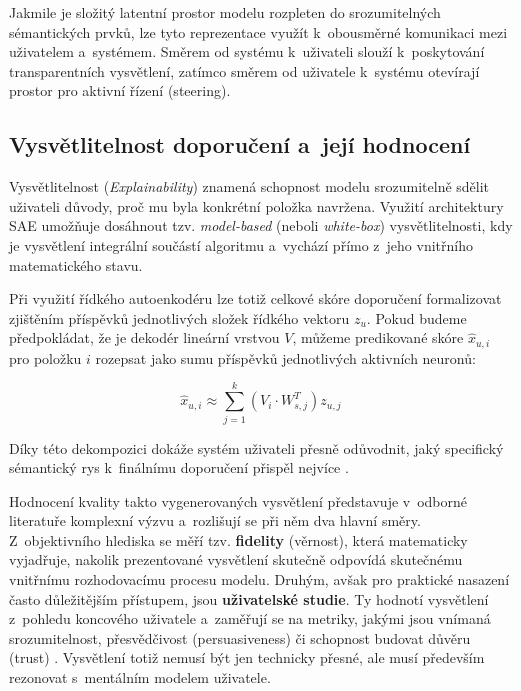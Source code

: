 Jakmile je složitý latentní prostor modelu rozpleten do srozumitelných sémantických prvků, lze tyto reprezentace využít k~obousměrné komunikaci mezi uživatelem a~systémem. Směrem od systému k~uživateli slouží k~poskytování transparentních vysvětlení, zatímco směrem od uživatele k~systému otevírají prostor pro aktivní řízení (steering).

\subsection{Vysvětlitelnost doporučení a~její hodnocení}
\label{subsec:vysvetlitelnost}

Vysvětlitelnost (\textit{Explainability}) znamená schopnost modelu srozumitelně sdělit uživateli důvody, proč mu byla konkrétní položka navržena. Využití architektury SAE umožňuje dosáhnout tzv. \textit{model-based} (neboli \textit{white-box}) vysvětlitelnosti, kdy je vysvětlení integrální součástí algoritmu a~vychází přímo z~jeho vnitřního matematického stavu. 

Při využití řídkého autoenkodéru lze totiž celkové skóre doporučení formalizovat zjištěním příspěvků jednotlivých složek řídkého vektoru $z_u$. Pokud budeme předpokládat, že je dekodér lineární vrstvou $V$, můžeme predikované skóre $\hat{x}_{u,i}$ pro položku $i$ rozepsat jako sumu příspěvků jednotlivých aktivních neuronů:

\begin{equation}
\hat{x}_{u,i} \approx \sum_{j=1}^k (V_i \cdot W_{s,j}^T) z_{u,j}
\end{equation}

Díky této dekompozici dokáže systém uživateli přesně odůvodnit, jaký specifický sémantický rys k~finálnímu doporučení přispěl nejvíce \cite{Spisak2024}. 

Hodnocení kvality takto vygenerovaných vysvětlení představuje v~odborné literatuře komplexní výzvu a~rozlišují se při něm dva hlavní směry. Z~objektivního hlediska se měří tzv. \textbf{fidelity} (věrnost), která matematicky vyjadřuje, nakolik prezentované vysvětlení skutečně odpovídá skutečnému vnitřnímu rozhodovacímu procesu modelu. Druhým, avšak pro praktické nasazení často důležitějším přístupem, jsou \textbf{uživatelské studie}. Ty hodnotí vysvětlení z~pohledu koncového uživatele a~zaměřují se na metriky, jakými jsou vnímaná srozumitelnost, přesvědčivost (persuasiveness) či schopnost budovat důvěru (trust) \cite{Tintarev2012}. Vysvětlení totiž nemusí být jen technicky přesné, ale musí především rezonovat s~mentálním modelem uživatele.

